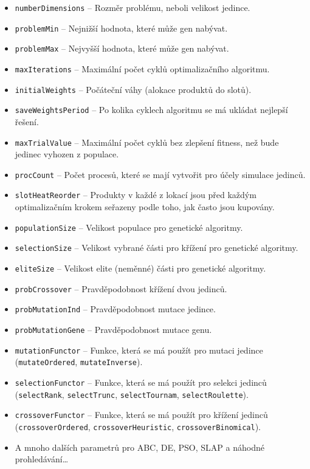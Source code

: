 \begin{itemize}
    \item \texttt{numberDimensions} -- Rozměr problému, neboli velikost jedince.
    \item \texttt{problemMin} -- Nejnižší hodnota, které může gen nabývat.
    \item \texttt{problemMax} -- Nejvyšší hodnota, které může gen nabývat.
    \item \texttt{maxIterations} -- Maximální počet cyklů optimalizačního algoritmu.
    \item \texttt{initialWeights} -- Počáteční váhy (alokace produktů do slotů).
    \item \texttt{saveWeightsPeriod} -- Po kolika cyklech algoritmu se má ukládat nejlepší řešení.
    \item \texttt{maxTrialValue} -- Maximální počet cyklů bez zlepšení fitness, než bude jedinec vyhozen z populace.
    \item \texttt{procCount} -- Počet procesů, které se mají vytvořit pro účely simulace jedinců.
    \item \texttt{slotHeatReorder} -- Produkty v každé z lokací jsou před každým optimalizačním krokem seřazeny podle toho, jak často jsou kupovány.
    \item \texttt{populationSize} -- Velikost populace pro genetické algoritmy.
    \item \texttt{selectionSize} -- Velikost vybrané části pro křížení pro genetické algoritmy.
    \item \texttt{eliteSize} -- Velikost elite (neměnné) části pro genetické algoritmy.
    \item \texttt{probCrossover} -- Pravděpodobnost křížení dvou jedinců.
    \item \texttt{probMutationInd} -- Pravděpodobnost mutace jedince.
    \item \texttt{probMutationGene} -- Pravděpodobnost mutace genu.
    \item \texttt{mutationFunctor} -- Funkce, která se má použít pro mutaci jedince (\texttt{mutateOrdered}, \texttt{mutateInverse}).
    \item \texttt{selectionFunctor} -- Funkce, která se má použít pro selekci jedinců (\texttt{selectRank}, \texttt{selectTrunc}, \texttt{selectTournam}, \texttt{selectRoulette}).
    \item \texttt{crossoverFunctor} -- Funkce, která se má použít pro křížení jedinců (\texttt{crossoverOrdered}, \texttt{crossoverHeuristic}, \texttt{crossoverBinomical}).
    \item A mnoho dalších parametrů pro ABC, DE, PSO, SLAP a náhodné prohledávání\ldots

\end{itemize}
